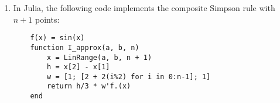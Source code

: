 \documentclass{article}
\begin{document}
\begin{enumerate}
    \item
        In Julia, the following code implements the composite Simpson rule with $n+1$ points:
        \begin{verbatim}
    f(x) = sin(x)
    function I_approx(a, b, n)
        x = LinRange(a, b, n + 1)
        h = x[2] - x[1]
        w = [1; [2 + 2(i%2) for i in 0:n-1]; 1]
        return h/3 * w'f.(x)
    end
        \end{verbatim}
    \end{enumerate}
\end{document}
